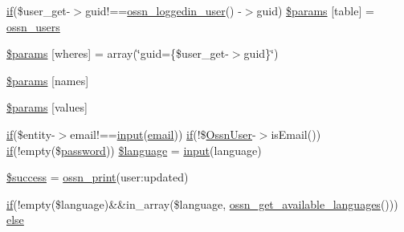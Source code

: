 \begin{DoxyCompactItemize}
\item 
\hyperlink{jquery_8tokeninput_8js_ad8dd46a3cbc004569e34401e9e71771a}{if}(\$user\+\_\+get-\/$>$guid!==\hyperlink{ossn_8lib_8users_8php_aa3c8068d0e6638b414d6a2f6c62565b8}{ossn\+\_\+loggedin\+\_\+user}() -\/$>$guid) \hyperlink{components_2_ossn_profile_2actions_2edit_8php_a043d4825362730eeb2dcfd9a746b9369}{\$params} \mbox{[}\textquotesingle{}table\textquotesingle{}\mbox{]} = \textquotesingle{}\hyperlink{ossn_8lib_8users_8php_a4c158699e1dfdfb749ee3595f0d42866}{ossn\+\_\+users}\textquotesingle{}
\item 
\hyperlink{components_2_ossn_profile_2actions_2edit_8php_ac68e07fb8a2ea1d5eeef67f9502d9b8b}{\$params} \mbox{[}\textquotesingle{}wheres\textquotesingle{}\mbox{]} = array(\char`\"{}guid=\textquotesingle{}\{\$user\+\_\+get-\/$>$guid\}\textquotesingle{}\char`\"{})
\item 
\hyperlink{components_2_ossn_profile_2actions_2edit_8php_a67ec260a883c7da762004ba9e18899de}{\$params} \mbox{[}\textquotesingle{}names\textquotesingle{}\mbox{]}
\item 
\hyperlink{components_2_ossn_profile_2actions_2edit_8php_a18a54f0ab0c8d6c611f5ddfffc9a5e6f}{\$params} \mbox{[}\textquotesingle{}values\textquotesingle{}\mbox{]}
\item 
\hyperlink{jquery_8tokeninput_8js_ad8dd46a3cbc004569e34401e9e71771a}{if}(\$entity-\/$>$email!==\hyperlink{ossn_8lib_8input_8php_a64ebee98b041c4f75f71ed3cd73cc8ed}{input}(\textquotesingle{}\hyperlink{actions_2account_8php_a011c66ae212438e0d7de7c0e40451bb3}{email}\textquotesingle{})) \hyperlink{jquery_8tokeninput_8js_ad8dd46a3cbc004569e34401e9e71771a}{if}(!\$\hyperlink{class_ossn_user}{Ossn\+User}-\/$>$is\+Email()) \hyperlink{jquery_8tokeninput_8js_ad8dd46a3cbc004569e34401e9e71771a}{if}(!empty(\$\hyperlink{actions_2account_8php_a3ef39d3ee8b2bcca6a288308549ccb44}{password})) \hyperlink{components_2_ossn_profile_2actions_2edit_8php_abb0d414e1404547a863663d06d3e601f}{\$language} = \hyperlink{ossn_8lib_8input_8php_a64ebee98b041c4f75f71ed3cd73cc8ed}{input}(\textquotesingle{}language\textquotesingle{})
\item 
\hyperlink{components_2_ossn_profile_2actions_2edit_8php_a944564ee11ad329573548875b62a269e}{\$success} = \hyperlink{ossn_8lib_8languages_8php_a2be5d1c4b695593a9b9067b96df2150a}{ossn\+\_\+print}(\textquotesingle{}user\+:updated\textquotesingle{})
\item 
\hyperlink{jquery_8tokeninput_8js_ad8dd46a3cbc004569e34401e9e71771a}{if}(!empty(\$language)\&\&in\+\_\+array(\$language, \hyperlink{ossn_8lib_8languages_8php_aacfdf2defbdd672a72a05af06772d97b}{ossn\+\_\+get\+\_\+available\+\_\+languages}())) \hyperlink{components_2_ossn_profile_2actions_2edit_8php_a74b55fd432ae5e4836bf30e96b38d3d6}{else}
\end{DoxyCompactItemize}


